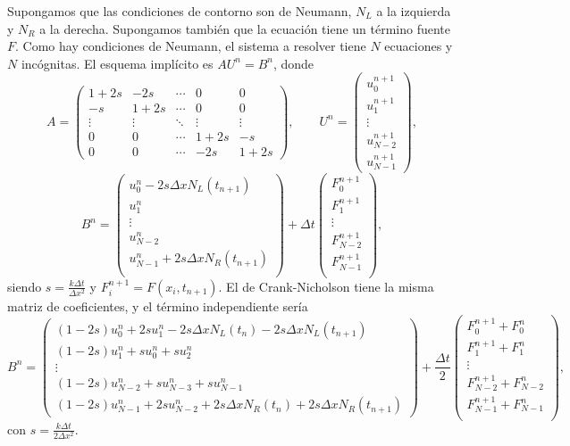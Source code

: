 \documentclass[a4paper, 12pt, oneside]{report}
\begin{document}
Supongamos que las condiciones de contorno son de Neumann, $N_L$ a la izquierda y $N_R$ a la derecha. Supongamos también que la ecuación tiene un término fuente $F$. Como hay condiciones de Neumann, el sistema a resolver tiene $N$ ecuaciones y $N$ incógnitas. El esquema implícito es $AU^n = B^n$, donde
\[A = \left(\begin{array}{ccccc}
    1+2s & -2s & \cdots & 0 & 0 \\
    -s & 1+2s & \cdots & 0 & 0 \\
    \vdots & \vdots & \ddots & \vdots & \vdots \\
    0 & 0 & \cdots & 1+2s & -s \\
    0 & 0 & \cdots & -2s & 1+2s
\end{array}\right), \qquad U^n = \left(\begin{array}{c}
    u_0^{n+1} \\
    u_1^{n+1} \\
    \vdots \\
    u_{N-2}^{n+1} \\
    u_{N-1}^{n+1}
\end{array}\right),\]
\[B^n = \left(\begin{array}{c}
    u_0^n -2s\Delta x N_L(t_{n+1}) \\
    u_1^n \\
    \vdots \\
    u_{N-2}^n \\
    u_{N-1}^n +2s\Delta x N_R(t_{n+1}) \\
\end{array}\right)+\Delta t\left(\begin{array}{c}
    F_0^{n+1} \\
    F_1^{n+1} \\
    \vdots \\
    F_{N-2}^{n+1} \\
    F_{N-1}^{n+1} \\
\end{array}\right),\]
\normalsize
siendo $s = \frac{k\Delta t}{\Delta x^2}$ y $F_i^{n+1} = F(x_i,t_{n+1})$. El de Crank-Nicholson tiene la misma matriz de coeficientes, y el término independiente sería
\small
\[B^n = \left(\begin{array}{c}
    (1-2s)u_0^n + 2su_1^n - 2s\Delta xN_L(t_n)-2s\Delta xN_L(t_{n+1}) \\
    (1-2s)u_1^n + su_0^n + su_2^n \\
    \vdots \\
    (1-2s)u_{N-2}^n + su_{N-3}^n + su_{N-1}^n  \\
    (1-2s)u_{N-1}^n + 2su_{N-2}^n + 2s\Delta xN_R(t_n) + 2s\Delta xN_R(t_{n+1}) 
\end{array}\right)+\frac{\Delta t}{2}\left(\begin{array}{c}
    F_0^{n+1}+F_0^{n} \\
    F_1^{n+1}+F_1^{n} \\
    \vdots \\
    F_{N-2}^{n+1}+F_{N-2}^{n} \\
    F_{N-1}^{n+1}+F_{N-1}^{n} \\
\end{array}\right),\]
\normalsize
con $s = \frac{k\Delta t}{2\Delta x^2}$. 
\end{document}
